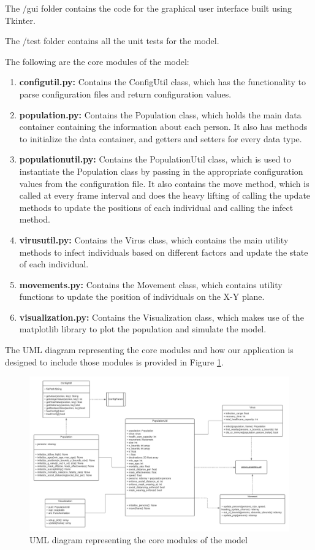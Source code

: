 \documentclass[11pt]{article}
\begin{document}
The /gui folder contains the code for the graphical user interface built using Tkinter.


The /test folder contains all the unit tests for the model.


The following are the core modules of the model:
\begin{enumerate}
    \item \textbf{config\textunderscore util.py:} Contains the ConfigUtil class, which has the functionality to parse configuration files and return configuration values.
    \item \textbf{population.py:}  Contains the Population class, which holds the main data container containing the information about each person. It also has methods to initialize the data container, and getters and setters for every data type. 
    \item \textbf{population\textunderscore util.py:}  Contains the PopulationUtil class, which is used to instantiate the Population class by passing in the appropriate configuration values from the configuration file. It also contains the move method, which is called at every frame interval and does the heavy lifting of calling the update methods to update the positions of each individual and calling the infect method.
    \item \textbf{virus\textunderscore util.py:} Contains the Virus class, which contains the main utility methods to infect individuals based on different factors and update the state of each individual.
    \item \textbf{movements.py:} Contains the Movement class, which contains utility functions to update the position of individuals on the X-Y plane.
    \item \textbf{visualization.py:} Contains the Visualization class, which makes use of the matplotlib library to plot the population and simulate the model.
\end{enumerate}

The UML diagram representing the core modules and how our application is designed to include those modules is provided in Figure \ref{uml-diag}.
 \begin{figure}[H]
    \centering
    \includegraphics[width=18cm]{figures/umlDiag.JPG}
    \caption{UML diagram representing the core modules of the model}
    \label{uml-diag}
\end{figure}
\end{document}
